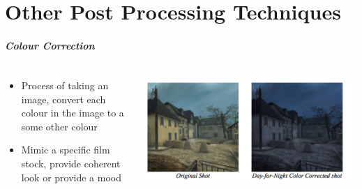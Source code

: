 \part{Other Post Processing Techniques}
\frame{\partpage}

  \begin{frame}
	\frametitle{Colour Correction}
	\begin{columns}
		\begin{column}{0.5\textwidth}
			\begin{itemize}
				\item Process of taking an image, convert each colour in the image to a some other colour
				\item Mimic a specific film stock, provide coherent look or provide a mood
			\end{itemize}
		\end{column}
		\begin{column}{0.5\textwidth}
			\begin{center}
				\includegraphics[width=\textwidth]{colour_correction_daynight}
			\end{center}
		\end{column}
	\end{columns}
\end{frame}


